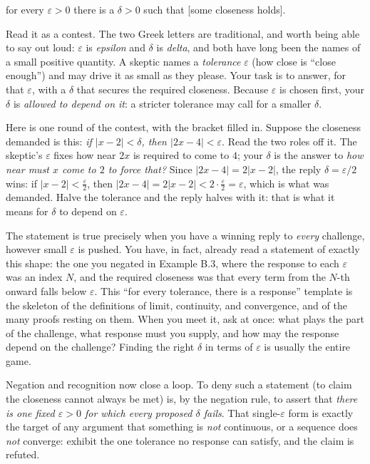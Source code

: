 \documentclass[a4paper,12pt,oneside]{memoir}
\begin{document}
\begin{centerstatement}
for every \(\varepsilon > 0\) there is a \(\delta > 0\) such that [some closeness holds].
\end{centerstatement}
Read it as a contest. The two Greek letters are traditional, and worth being able to say out loud: \(\varepsilon\) is \emph{epsilon} and \(\delta\) is \emph{delta}, and both have long been the names of a small positive quantity. A skeptic names a \emph{tolerance} \(\varepsilon\) (how close is “close enough”) and may drive it as small as they please. Your task is to answer, for that \(\varepsilon\), with a \(\delta\) that secures the required closeness. Because \(\varepsilon\) is chosen first, your \(\delta\) is \emph{allowed to depend on it}: a stricter tolerance may call for a smaller \(\delta\).

Here is one round of the contest, with the bracket filled in. Suppose the closeness demanded is this: \emph{if \(|x - 2| < \delta\), then \(|2x - 4| < \varepsilon\)}. Read the two roles off it. The skeptic’s \(\varepsilon\) fixes how near \(2x\) is required to come to \(4\); your \(\delta\) is the answer to \emph{how near must \(x\) come to \(2\) to force that?} Since \(|2x - 4| = 2|x - 2|\), the reply \(\delta = \varepsilon/2\) wins: if \(|x - 2| < \tfrac{\varepsilon}{2}\), then \(|2x - 4| = 2|x - 2| < 2 \cdot \tfrac{\varepsilon}{2} = \varepsilon\), which is what was demanded. Halve the tolerance and the reply halves with it: that is what it means for \(\delta\) to depend on \(\varepsilon\).

The statement is true precisely when you have a winning reply to \emph{every} challenge, however small \(\varepsilon\) is pushed. You have, in fact, already read a statement of exactly this shape: the one you negated in Example B.3, where the response to each \(\varepsilon\) was an index \(N\), and the required closeness was that every term from the \(N\)-th onward falls below \(\varepsilon\). This “for every tolerance, there is a response” template is the skeleton of the definitions of limit, continuity, and convergence, and of the many proofs resting on them. When you meet it, ask at once: what plays the part of the challenge, what response must you supply, and how may the response depend on the challenge? Finding the right \(\delta\) in terms of \(\varepsilon\) is usually the entire game.

Negation and recognition now close a loop. To deny such a statement (to claim the closeness cannot always be met) is, by the negation rule, to assert that \emph{there is one fixed \(\varepsilon > 0\) for which every proposed \(\delta\) fails}. That single-\(\varepsilon\) form is exactly the target of any argument that something is \emph{not} continuous, or a sequence does \emph{not} converge: exhibit the one tolerance no response can satisfy, and the claim is refuted.
\end{document}
